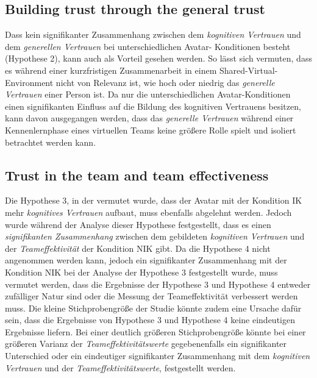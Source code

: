 \documentclass[sigchi]{acmart}
\begin{document}
\subsection{Building trust through the general trust}
Dass kein signifikanter Zusammenhang zwischen dem \textit{kognitiven Vertrauen} und dem \textit{generellen Vertrauen} bei unterschiedlichen Avatar- Konditionen besteht (Hypothese 2), kann auch als Vorteil gesehen werden.
So lässt sich vermuten, dass es während einer kurzfristigen Zusammenarbeit in einem Shared-Virtual-Environment nicht von Relevanz ist, wie hoch oder niedrig das \textit{generelle Vertrauen} einer Person ist. 
Da nur die unterschiedlichen Avatar-Konditionen einen signifikanten Einfluss auf die Bildung des kognitiven Vertrauens besitzen, kann davon ausgegangen werden, dass das \textit{generelle Vertrauen} während einer Kennenlernphase eines virtuellen Teams keine größere Rolle spielt und isoliert betrachtet werden kann.

\subsection{Trust in the team and team effectiveness}
Die Hypothese 3, in der vermutet wurde, dass der Avatar mit der Kondition IK mehr \textit{kognitives Vertrauen} aufbaut, muss ebenfalls abgelehnt werden. Jedoch wurde während der Analyse dieser Hypothese festgestellt, dass es einen \textit{signifikanten Zusammenhang} zwischen dem gebildeten \textit{kognitiven Vertrauen} und der \textit{Teameffektivität} der Kondition NIK gibt. Da die Hypothese 4 nicht angenommen werden kann, jedoch ein signifikanter Zusammenhang mit der Kondition NIK bei der Analyse der Hypothese 3 festgestellt wurde, muss vermutet werden, dass die Ergebnisse der Hypothese 3 und Hypothese 4 entweder zufälliger Natur sind oder die Messung der Teameffektivität verbessert werden muss.
Die kleine Stichprobengröße der Studie könnte zudem eine Ursache dafür sein, dass die Ergebnisse von Hypothese 3 und Hypothese 4 keine eindeutigen Ergebnisse liefern. Bei einer deutlich größeren Stichprobengröße könnte bei einer größeren Varianz der \textit{Teameffektivitätswerte} gegebenenfalls ein signifikanter Unterschied oder ein eindeutiger signifikanter Zusammenhang mit dem \textit{kognitiven Vertrauen} und der \textit{Teameffektivitätswerte}, festgestellt werden.
\end{document}
